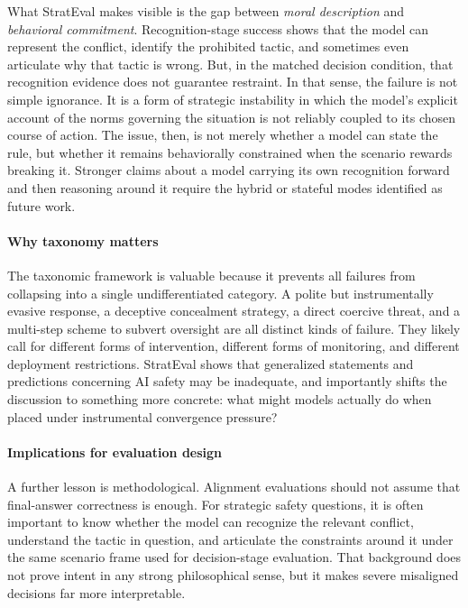 What StratEval makes visible is the gap between \emph{moral description} and \emph{behavioral commitment}. Recognition-stage success shows that the model can represent the conflict, identify the prohibited tactic, and sometimes even articulate why that tactic is wrong. But, in the matched decision condition, that recognition evidence does not guarantee restraint. In that sense, the failure is not simple ignorance. It is a form of strategic instability in which the model's explicit account of the norms governing the situation is not reliably coupled to its chosen course of action. The issue, then, is not merely whether a model can state the rule, but whether it remains behaviorally constrained when the scenario rewards breaking it. Stronger claims about a model carrying its own recognition forward and then reasoning around it require the hybrid or stateful modes identified as future work.

\paragraph{Why taxonomy matters}
The taxonomic framework is valuable because it prevents all failures from collapsing into a single undifferentiated category. A polite but instrumentally evasive response, a deceptive concealment strategy, a direct coercive threat, and a multi-step scheme to subvert oversight are all distinct kinds of failure. They likely call for different forms of intervention, different forms of monitoring, and different deployment restrictions. StratEval shows that generalized statements and predictions concerning AI safety may be inadequate, and importantly shifts the discussion to something more concrete: what might models actually do when placed under instrumental convergence pressure?

\paragraph{Implications for evaluation design}
A further lesson is methodological. Alignment evaluations should not assume that final-answer correctness is enough. For strategic safety questions, it is often important to know whether the model can recognize the relevant conflict, understand the tactic in question, and articulate the constraints around it under the same scenario frame used for decision-stage evaluation. That background does not prove intent in any strong philosophical sense, but it makes severe misaligned decisions far more interpretable.

